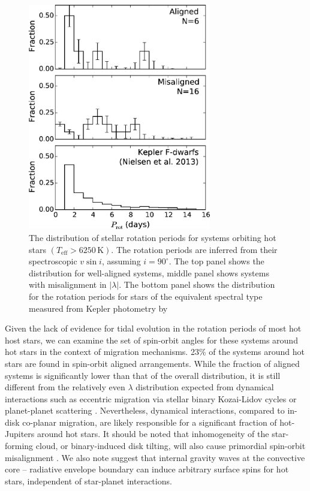 \documentclass[useAMS,usenatbib]{mn2e}
\begin{document}
\begin{figure}
  \includegraphics[width=8cm]{plots/prot_hist.eps}
  
  \caption{\label{fig:prot_hist}The distribution of stellar rotation periods for systems orbiting hot stars $(T_\text{eff}>6250\,\text{K})$. The rotation periods are inferred from their spectroscopic $v\sin i$, assuming $i=90^\circ$. The top panel shows the distribution for well-aligned systems, middle panel shows systems with misalignment in $|\lambda|$. The bottom panel shows the distribution for the rotation periods for stars of the equivalent spectral type measured from Kepler photometry by \citet{2013A&amp;A...557L..10N}}
\end{figure}

Given the lack of evidence for tidal evolution in the rotation periods of most hot host stars, we can examine the set of spin-orbit angles for these systems around hot stars in the context of migration mechanisms. 23\% of the systems around hot stars are found in spin-orbit aligned arrangements. While the fraction of aligned systems is significantly lower than that of the overall distribution, it is still different from the relatively even $\lambda$ distribution expected from dynamical interactions such as eccentric migration via stellar binary Kozai-Lidov cycles \citep[e.g.][]{2012ApJ...754L..36N,2015ApJ...799...27P} or planet-planet scattering \citep[e.g.][]{2011ApJ...742...72N}. Nevertheless, dynamical interactions, compared to in-disk co-planar migration, are likely responsible for a significant fraction of hot-Jupiters around hot stars. It should be noted that inhomogeneity of the star-forming cloud, or binary-induced disk tilting, will also cause primordial spin-orbit misalignment \citep{2010MNRAS.401.1505B,2012Natur.491..418B}. We also note \citet{2012ApJ...758L...6R} suggest that internal gravity waves at the convective core -- radiative envelope boundary can induce arbitrary surface spins for hot stars, independent of star-planet interactions.
\end{document}
